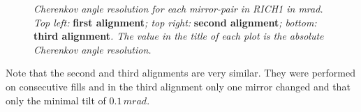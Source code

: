 \begin{figure}[!h]
	\vspace*{-0.cm}
	\begin{center}
		\vspace*{-0.5cm}
	\end{center}
	\caption{\textit{Cherenkov angle resolution for each mirror-pair in RICH1 in mrad. Top left:} \textbf{first alignment}\textit{; top right:} \textbf{second alignment}\textit{; bottom:} \textbf{third alignment}\textit{. The value in the title of each plot is the absolute Cherenkov angle resolution. } }
	\label{fig:rich1maps}
\end{figure}


Note that the second and third alignments are very similar. They were performed on consecutive fills and in the third alignment only one mirror changed and that only the minimal tilt of $0.1\, mrad$.\\


